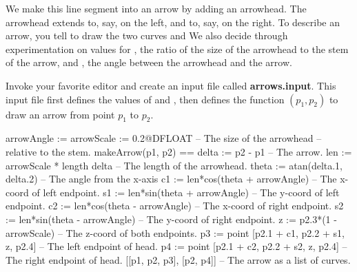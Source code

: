 We make this line segment into an arrow by adding an arrowhead.
The arrowhead extends to,
say,  on the left, and to, say,  on the right.
To describe an arrow, you tell \Language{} to draw the two curves
\spad{[p1, p2, p3]} and 
We also decide through experimentation on
values for , the ratio of the size of
the arrowhead to the stem of the arrow, and ,
the angle between the arrowhead and the arrow.

Invoke your favorite editor and create
an input file called {\bf arrows.input}.
This input file first defines the values of
 and , then
defines the function $(p_1, p_2)$ to
draw an arrow from point $p_1$ to $p_2$.

\begin{xmpLines}
arrowAngle := %
arrowScale := 0.2@DFLOAT                       -- The size of the arrowhead
                                               -- \quad{}relative to the stem.
makeArrow(p1, p2) ==
  delta := p2 - p1                             -- The arrow.
  len := arrowScale * length delta             -- The length of the arrowhead.
  theta := atan(delta.1, delta.2)              -- The angle from the x-axis
  c1 := len*cos(theta + arrowAngle)            -- The x-coord of left endpoint.
  s1 := len*sin(theta + arrowAngle)            -- The y-coord of left endpoint.
  c2 := len*cos(theta - arrowAngle)            -- The x-coord of right endpoint.
  s2 := len*sin(theta - arrowAngle)            -- The y-coord of right endpoint.
  z  := p2.3*(1 - arrowScale)                  -- The z-coord of both endpoints.
  p3 := point [p2.1 + c1, p2.2 + s1, z, p2.4]  -- The left endpoint of head.
  p4 := point [p2.1 + c2, p2.2 + s2, z, p2.4]  -- The right endpoint of head.
  [[p1, p2, p3], [p2, p4]]                     -- The arrow as a list of curves.
\end{xmpLines}

